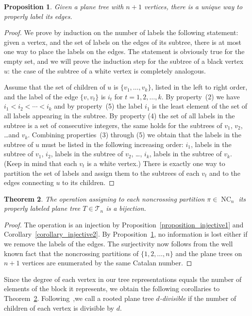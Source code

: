 \documentclass[11pt]{amsart}
\newtheorem{theorem}{Theorem}[section]
\newtheorem{proposition}[theorem]{Proposition}
\numberwithin{equation}{section}
\newcommand{\ptree}{{\mathcal T}}
\DeclareMathOperator{\NC}{NC}
\begin{document}
\begin{proposition}
\label{proposition_unique}  
Given a plane tree with $n+1$ vertices, there is a unique way to
properly label its edges.
\end{proposition}
\begin{proof}
We prove by induction on the number of labels the following statement:
given a vertex, and the set of labels on the edges of its subtree, there
is at most one way to place the labels on the edges. The statement is
obviously true for the empty set, and we will prove the induction step
for the subtree of a black vertex $u$: the case of the subtree of a
white vertex is completely analogous.

Assume that the set of children of $u$ is $\{v_{1},\ldots,v_{k}\}$, listed in
the left to right order, and the label of the edge $\{v,v_{t}\}$ is $i_{t}$
for $t=1,2,\ldots,k$. By property~(2) we have $i_{1}<i_{2}<\cdots <i_{k}$ and
by property~(5) the label $i_{1}$ is the least element of the set of all
labels appearing in the subtree. By property (4) the set of all labels
in the subtree is a set of consecutive integers, the same holds for the
subtrees of $v_{1}$, $v_{2}$, \ldots and $v_{k}$. Combining properties~(3)
through (5) we obtain that the labels in the subtree of $u$ must be
listed in the following increasing order: $i_{1}$, labels in the subtree
of $v_{1}$, $i_{2}$, labels in the subtree of $v_{2}$, \ldots, $i_{k}$, labels
in the subtree of $v_{k}$. (Keep in mind that each $v_{t}$ is a white vertex.) 
There is exactly one way to partition the set of labels and assign them
to the subtrees of each $v_{t}$ and to the edges connecting $u$ to its
children. 
\end{proof}  
\begin{theorem}
\label{theorem_treerep}
The operation assigning to each noncrossing partition $\pi\in\NC_{n}$
its properly labeled plane tree $T\in\ptree_{n}$ is a bijection.
\end{theorem}  
\begin{proof}
The operation is an injection by Proposition~\ref{proposition_injective1} and
Corollary~\ref{corollary_injective2}. By Proposition~\ref{proposition_unique}, no
information is lost either if we remove the labels of the edges. The
surjectivity now follows from the well known fact that the 
noncrossing partitions of $\{1,2, \ldots, n\}$ and the plane
trees on $n+1$ vertices are enumerated by the same Catalan number.  
\end{proof}

Since the degree of each vertex in our tree representations equals the
number of elements of the block it represents, we obtain the following
corollaries to
Theorem~\ref{theorem_treerep}. Following~\cite[Remark~4.2]{Muhle_Nadeau_Williams},we
call a rooted plane tree {\em $d$-divisible} if the number of children
of each vertex is divisible by $d$.  
\end{document}
